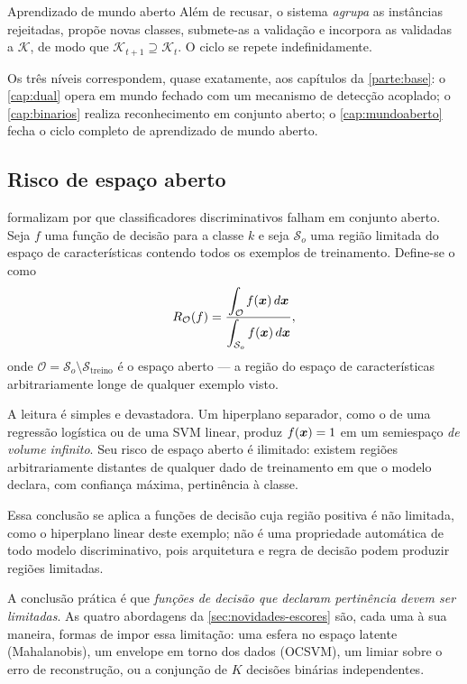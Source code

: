 \begin{definicao}{Aprendizado de mundo aberto}
Além de recusar, o sistema \emph{agrupa} as instâncias rejeitadas, propõe novas classes,
submete-as a validação e incorpora as validadas a $\mathcal{K}$, de modo que
$\mathcal{K}_{t+1} \supseteq \mathcal{K}_{t}$. O ciclo se repete indefinidamente.
\end{definicao}

Os três níveis correspondem, quase exatamente, aos capítulos da \cref{parte:base}: o
\cref{cap:dual} opera em mundo fechado com um mecanismo de detecção acoplado; o
\cref{cap:binarios} realiza reconhecimento em conjunto aberto; o \cref{cap:mundoaberto}
fecha o ciclo completo de aprendizado de mundo aberto.

\subsection{Risco de espaço aberto}

\citet{Scheirer2013} formalizam por que classificadores discriminativos falham em
conjunto aberto. Seja $f$ uma função de decisão para a classe $k$ e seja
$\mathcal{S}_o$ uma região limitada do espaço de características contendo todos os
exemplos de treinamento. Define-se o 
como
\begin{equation}
  R_{\mathcal{O}}(f) = \frac{\displaystyle\int_{\mathcal{O}} f(\bm{x})\, d\bm{x}}
                             {\displaystyle\int_{\mathcal{S}_o} f(\bm{x})\, d\bm{x}},
  \label{eq:open-space-risk}
\end{equation}
onde $\mathcal{O} = \mathcal{S}_o \setminus \mathcal{S}_{\text{treino}}$ é o espaço
aberto --- a região do espaço de características arbitrariamente longe de qualquer
exemplo visto.

A leitura é simples e devastadora. Um hiperplano separador, como o de uma regressão
logística ou de uma SVM linear, produz $f(\bm{x}) = 1$ em um semiespaço \emph{de
volume infinito}. Seu risco de espaço aberto é ilimitado: existem regiões
arbitrariamente distantes de qualquer dado de treinamento em que o modelo declara,
com confiança máxima, pertinência à classe.

Essa conclusão se aplica a funções de decisão cuja região positiva é não limitada,
como o hiperplano linear deste exemplo; não é uma propriedade automática de todo modelo
discriminativo, pois arquitetura e regra de decisão podem produzir regiões limitadas.

\begin{destaque}
A conclusão prática é que \emph{funções de decisão que declaram pertinência devem ser
limitadas}. As quatro abordagens da \cref{sec:novidades-escores} são, cada uma à sua
maneira, formas de impor essa limitação: uma esfera no espaço latente (Mahalanobis), um
envelope em torno dos dados (OCSVM), um limiar sobre o erro de reconstrução, ou a
conjunção de $K$ decisões binárias independentes.
\end{destaque}

